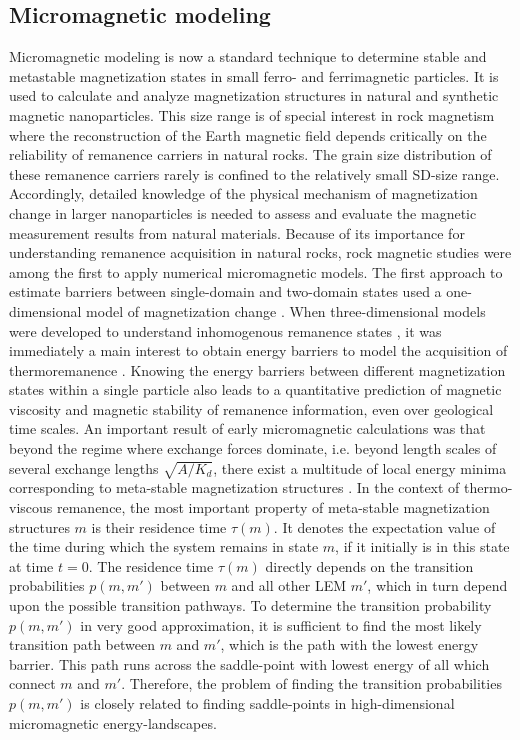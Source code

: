 \subsection{Micromagnetic modeling}
Micromagnetic modeling is now a standard technique to determine
stable and metastable magnetization states in small ferro- and ferrimagnetic particles. It is used to calculate and analyze  magnetization structures
          in natural and synthetic magnetic nanoparticles.
          This size range is of special interest in rock magnetism
    where the reconstruction of the Earth magnetic field depends critically
    on the reliability of remanence carriers in natural rocks.
    The grain size distribution of these remanence carriers
    rarely is confined to the relatively small SD-size range.
     Accordingly, detailed knowledge of the
    physical mechanism of magnetization change in larger nanoparticles is
    needed to assess and evaluate the magnetic measurement results from natural
    materials.
Because of its importance for understanding remanence acquisition in natural rocks, rock magnetic studies were among the first to apply numerical micromagnetic models.
The first approach to estimate barriers between single-domain and two-domain states
used a one-dimensional model of magnetization change \cite{Enkin:88}.
When three-dimensional models were developed
to understand inhomogenous remanence states \cite{Williams:89}, it was immediately a main interest
to obtain energy barriers to model the acquisition of thermoremanence \cite{Enkin:94,Thomson:94,Winklhofer:97,Muxworthy:03}.
Knowing the energy barriers between
different magnetization states within a single particle
also leads to a  quantitative prediction  of magnetic viscosity and
magnetic stability of remanence information, even over geological time scales.
%
An important result of early micromagnetic calculations was that beyond the regime where exchange
    forces
    dominate, i.e. beyond length scales of several exchange lengths $\sqrt{A/K_d}$,
    there exist a multitude of local energy minima corresponding to meta-stable magnetization
    structures \cite{Williams:89,Fabian:96,Rave:98}.
In the context of thermo-viscous remanence, the most important property of meta-stable magnetization
    structures $m$ is their
    residence time $\tau(m)$. It denotes the expectation value of the
    time during which the system remains in
    state $m$, if it initially is in this state at time $t=0$.
The residence time $\tau(m)$ directly depends on the transition probabilities
    $p(m,m')$ between $m$ and all other LEM $m'$, which in turn depend upon the
    possible transition pathways.
To determine the transition probability $p(m,m')$ in very good approximation,
    it is sufficient to find the   most likely transition path between $m$ and  $m'$,
    which is the path with  the lowest energy barrier.
    This path  runs across the saddle-point with lowest energy of all
    which connect  $m$ and $m'$.
Therefore, the problem of finding the
    transition probabilities $p(m,m')$ is closely related to finding saddle-points in high-dimensional
    micromagnetic energy-landscapes.
    
